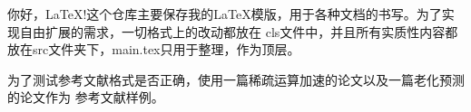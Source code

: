 你好，\LaTeX!这个仓库主要保存我的\LaTeX 模版，用于各种文档的书写。为了实现自由扩展的需求，一切格式上的改动都放在
cls文件中，并且所有实质性内容都放在src文件夹下，main.tex只用于整理，作为顶层。

为了测试参考文献格式是否正确，使用一篇稀疏运算加速的论文以及一篇老化预测的论文作为
参考文献样例。
